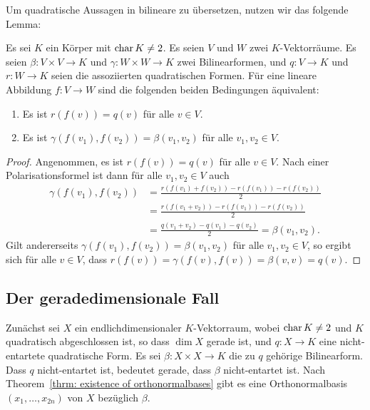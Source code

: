 \documentclass[a4paper,10pt,numbers=noenddot]{scrartcl}
\begin{document}
Um quadratische Aussagen in bilineare zu übersetzen, nutzen wir das folgende Lemma:


\begin{lemma}\label{lem: homomorphism of quadratic and bilinear spaces}
  Es sei $K$ ein Körper mit $\operatorname{char} K \neq 2$.
  Es seien $V$ und $W$ zwei $K$-Vektorräume.
  Es seien $\beta \colon V \times V \to K$ und $\gamma \colon W \times W \to K$ zwei Bilinearformen, und $q \colon V \to K$ und $r \colon W \to K$ seien die assoziierten quadratischen Formen.
  Für eine lineare Abbildung $f \colon V \to W$ sind die folgenden beiden Bedingungen äquivalent:
  \begin{enumerate}
    \item
      Es ist $r(f(v)) = q(v)$ für alle $v \in V$.
    \item
      Es ist $\gamma(f(v_1),f(v_2)) = \beta(v_1, v_2)$ für alle $v_1, v_2 \in V$.
  \end{enumerate}
\end{lemma}
\begin{proof}
  Angenommen, es ist $r(f(v)) = q(v)$ für alle $v \in V$.
  Nach einer Polarisationsformel ist dann für alle $v_1, v_2 \in V$ auch
  \begin{align*}
        \gamma(f(v_1), f(v_2))
    &=  \frac{r(f(v_1) + f(v_2)) - r(f(v_1)) - r(f(v_2))}{2}  \\
    &=  \frac{r(f(v_1 + v_2)) - r(f(v_1)) - r(f(v_2))}{2}     \\
    &=  \frac{q(v_1 + v_2) - q(v_1) - q(v_2)}{2}
    =   \beta(v_1, v_2).
  \end{align*}
  Gilt andererseits $\gamma(f(v_1), f(v_2)) = \beta(v_1, v_2)$ für alle $v_1, v_2 \in V$, so ergibt sich für alle $v \in V$, dass
  $ r(f(v)) = \gamma(f(v), f(v)) = \beta(v, v) = q(v)$.
\end{proof}





\subsection{Der geradedimensionale Fall}


Zunächst sei $X$ ein endlichdimensionaler $K$-Vektorraum, wobei $\operatorname{char} K \neq 2$ und $K$ quadratisch abgeschlossen ist, so dass $\dim X$ gerade ist, und $q \colon X \to K$ eine nicht-entartete quadratische Form.
Es sei $\beta \colon X \times X \to K$ die zu $q$ gehörige Bilinearform.
Dass $q$ nicht-entartet ist, bedeutet gerade, dass $\beta$ nicht-entartet ist.
Nach Theorem~\ref{thrm: existence of orthonormalbases} gibt es eine Orthonormalbasis $(x_1, \dotsc, x_{2n})$ von $X$ bezüglich $\beta$.
\end{document}
